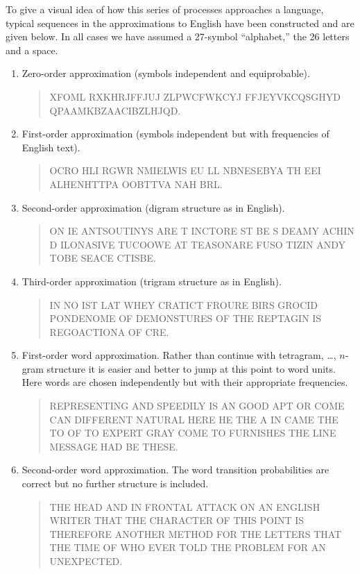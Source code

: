 To give a visual idea of how this series of processes approaches a
language, typical sequences in the approximations to English have been
constructed and are given below.  In all cases we have assumed a 27-symbol
``alphabet,'' the 26 letters and a space.
\begin{enumerate}
\item
Zero-order approximation (symbols independent and equiprobable).
\begin{quote}
\sloppy
XFOML RXKHRJFFJUJ ZLPWCFWKCYJ FFJEYVKCQSGHYD QPA\-AMKBZ\-A\-AC\-IB\-ZL\-HJQD.
\end{quote}
\item
First-order approximation (symbols independent but with frequencies of
English text).
\begin{quote}
\sloppy
OCRO HLI RGWR NMIELWIS EU LL NBNESEBYA TH EEI ALHENHTTPA OOBTTVA NAH BRL.
\end{quote}
\item
Second-order approximation (digram structure as in English).
\begin{quote}
\sloppy
ON IE ANTSOUTINYS ARE T INCTORE ST BE S DEAMY ACHIN D ILONASIVE TUCOOWE
AT TEASONARE FUSO TIZIN ANDY TOBE SEACE CTISBE.
\end{quote}
\item
Third-order approximation (trigram structure as in English).
\begin{quote}
\sloppy
IN NO IST LAT WHEY CRATICT FROURE BIRS GROCID PONDENOME OF DEMONSTURES
OF THE REPTAGIN IS REGOACTIONA OF CRE.
\end{quote}
\item
First-order word approximation.  Rather than continue with tetragram,
\dots, $n$-gram structure it is easier and better to jump at this
point to word units.  Here words are chosen independently but with their
appropriate frequencies.
\begin{quote}
\sloppy
REPRESENTING AND SPEEDILY IS AN GOOD APT OR COME CAN DIFFERENT NATURAL
HERE HE THE A IN CAME THE TO OF TO EXPERT GRAY COME TO FURNISHES THE
LINE MESSAGE HAD BE THESE.
\end{quote}
\item
Second-order word approximation.  The word transition probabilities are
correct but no further structure is included.
\begin{quote}
\sloppy
THE HEAD AND IN FRONTAL ATTACK ON AN ENGLISH WRITER THAT THE CHARACTER
OF THIS POINT IS THEREFORE ANOTHER METHOD FOR THE LETTERS THAT THE TIME
OF WHO EVER TOLD THE PROBLEM FOR AN UNEXPECTED.
\end{quote}
\end{enumerate}

